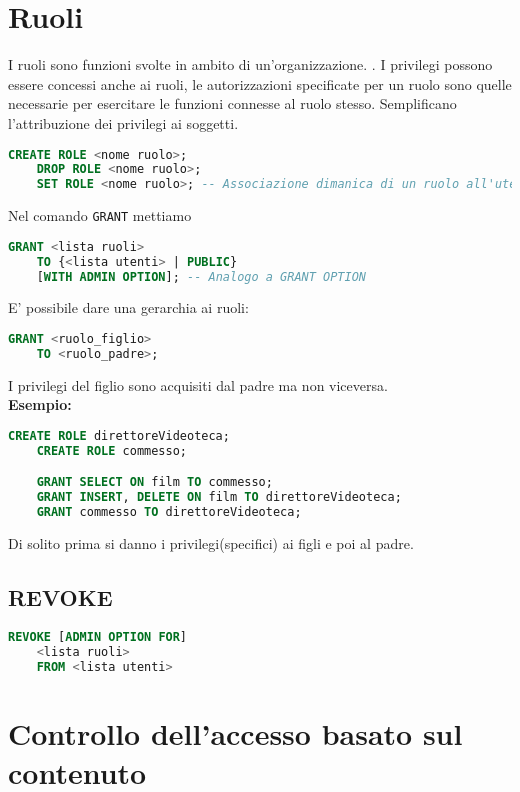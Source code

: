 \documentclass[12pt]{article}
\begin{document}
\section{Ruoli}
I ruoli sono funzioni svolte in ambito di un'organizzazione. . I privilegi possono essere concessi anche ai ruoli, le autorizzazioni specificate per un ruolo sono quelle necessarie per esercitare le funzioni connesse al ruolo stesso. Semplificano l'attribuzione dei privilegi ai soggetti.
\begin{lstlisting}[language=SQL]
    CREATE ROLE <nome ruolo>;
    DROP ROLE <nome ruolo>;
    SET ROLE <nome ruolo>; -- Associazione dimanica di un ruolo all'utente della sessione attiva
\end{lstlisting}
Nel comando \texttt{GRANT} mettiamo
\begin{lstlisting}[language=SQL]
    GRANT <lista ruoli>
    TO {<lista utenti> | PUBLIC}
    [WITH ADMIN OPTION]; -- Analogo a GRANT OPTION
\end{lstlisting}
E' possibile dare una gerarchia ai ruoli:
\begin{lstlisting}[language=SQL]
    GRANT <ruolo_figlio> 
    TO <ruolo_padre>;
\end{lstlisting}
I privilegi del figlio sono acquisiti dal padre ma non viceversa.
\\\textbf{Esempio:}
\begin{lstlisting}[language=SQL]
    CREATE ROLE direttoreVideoteca;
    CREATE ROLE commesso;

    GRANT SELECT ON film TO commesso;
    GRANT INSERT, DELETE ON film TO direttoreVideoteca;
    GRANT commesso TO direttoreVideoteca;
\end{lstlisting}
Di solito prima si danno i privilegi(specifici) ai figli e poi al padre.
\subsection{REVOKE}
\begin{lstlisting}[language=SQL]
    REVOKE [ADMIN OPTION FOR]
    <lista ruoli>
    FROM <lista utenti>
\end{lstlisting}
\section{Controllo dell'accesso basato sul contenuto}
\end{document}
